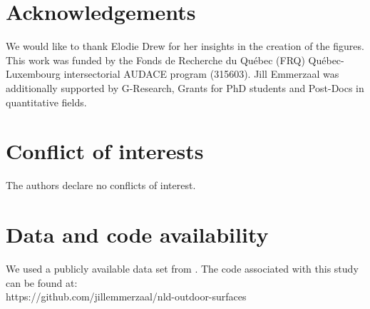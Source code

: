 \documentclass[authoryear,preprint,review,12pt]{elsarticle}
\begin{document}





\section*{Acknowledgements}
We would like to thank Elodie Drew for her insights in the creation of the figures. This work was funded by the Fonds de Recherche du Qu\'ebec (FRQ) Québec-Luxembourg intersectorial AUDACE program (315603). Jill Emmerzaal was additionally supported by G-Research, Grants for PhD students and Post-Docs in quantitative fields.

\section*{Conflict of interests}
The authors declare no conflicts of interest.

\section*{Data and code availability}
We used a publicly available data set from \citet{luo_database_2020}. The code associated with this study can be found at: \\
https://github.com/jillemmerzaal/nld-outdoor-surfaces


 

\end{document}
